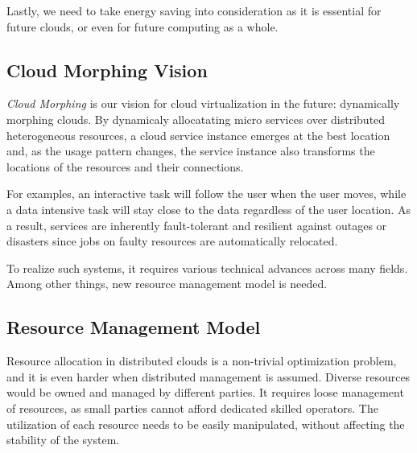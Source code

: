 Lastly, we need to take energy saving into consideration as it is
essential for future clouds, or even for future computing as a whole.

\subsection{Cloud Morphing Vision}

{\em Cloud Morphing} is our vision for cloud virtualization in the future:
dynamically morphing clouds.
By dynamicaly allocatating micro services over distributed
heterogeneous resources, a cloud service instance emerges at the best
location and, as the usage pattern changes, the service instance also
transforms the locations of the resources and their connections.

For examples, an interactive task will follow the user when the user
moves, while a data intensive task will stay close
to the data regardless of the user location. As a result, services are
inherently fault-tolerant and resilient against outages or disasters
since jobs on faulty resources are automatically relocated.

To realize such systems, it requires various technical advances across
many fields.  Among other things, new resource management model is
needed.



\subsection{Resource Management Model}

Resource allocation in distributed clouds is a non-trivial
optimization problem, and it is even harder when distributed
management is assumed.
Diverse resources would be owned and managed by different parties.
It requires loose management of resources, as small parties cannot
afford dedicated skilled operators.
The utilization of each resource needs to be easily manipulated,
without affecting the stability of the system.

